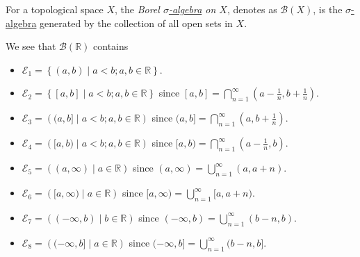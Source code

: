 \begin{definition}\label{def:Borel-sigma-algebra}
	For a topological space \(X\), the \emph{Borel \hyperref[def:sigma-algebra]{\(\sigma\)-algebra} on \(X\)}, denotes as \(\mathcal{B}(X)\), is the \hyperref[def:sigma-algebra]{\(\sigma\)-algebra} generated by the collection of all open sets in \(X\).
\end{definition}

\begin{eg}\label{eg:lec2}
	We see that \(\mathcal{B} (\mathbb{R} )\) contains
	\begin{itemize}
		\item \(\mathcal{E}_1 = \left\{(a, b) \mid a < b; a, b\in \mathbb{R} \right\}\).
		\item \(\mathcal{E}_2 = \left\{[a, b] \mid a < b; a, b\in \mathbb{R} \right\}\) since \([a, b] = \bigcap_{n=1}^{\infty} (a - \frac{1}{n}, b + \frac{1}{n})\).
		\item \(\mathcal{E}_3 = \left((a, b]  \mid a < b; a, b\in \mathbb{R} \right)\) since \((a, b] = \bigcap_{n=1}^{\infty} (a, b + \frac{1}{n})\).
		\item \(\mathcal{E}_4 = \left([a, b)  \mid a < b; a, b\in \mathbb{R} \right)\) since \([a, b) = \bigcap_{n=1}^{\infty} (a - \frac{1}{n}, b)\).
		\item \(\mathcal{E}_5 = \left((a, \infty)  \mid a\in \mathbb{R} \right)\) since \((a, \infty) = \bigcup_{n=1}^{\infty} (a , a + n)\).
		\item \(\mathcal{E}_6 = \left([a, \infty)  \mid a\in \mathbb{R} \right)\) since \([a, \infty) = \bigcup_{n=1}^{\infty} [a , a + n)\).
		\item \(\mathcal{E}_7 = \left((-\infty, b) \mid b\in \mathbb{R} \right)\) since \((-\infty, b) = \bigcup_{n=1}^{\infty} (b - n, b)\).
		\item \(\mathcal{E}_8 = \left((-\infty, b] \mid a\in \mathbb{R} \right)\) since \((-\infty, b] = \bigcup_{n=1}^{\infty} (b - n, b]\).
	\end{itemize}
\end{eg}

